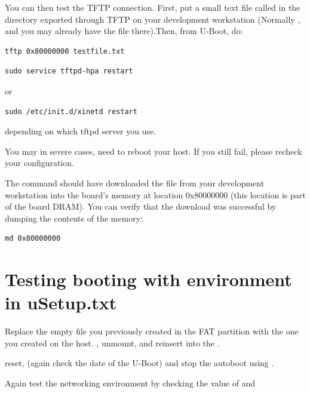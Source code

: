 You can then test the TFTP connection. First, put a small text file called
 in the directory exported through TFTP on your development
workstation (Normally , and you may already have the file there).Then, from U-Boot, do:

\begin{verbatim}
tftp 0x80000000 testfile.txt
\end{verbatim}



\begin{verbatim}
sudo service tftpd-hpa restart
\end{verbatim}

or

\begin{verbatim}
sudo /etc/init.d/xinetd restart
\end{verbatim}

depending on which tftpd server you use.

You may in severe cases, need to reboot your host.
If you still fail, please recheck your configuration.

The  command should have downloaded
the  file from your development
workstation into the board's memory at location 0x80000000 (this
location is part of the board DRAM). You can verify that the download
was successful by dumping the contents of the memory:

\begin{verbatim}
md 0x80000000
\end{verbatim}

\clearpage
\section{Testing booting with environment in uSetup.txt}

Replace the empty  file you previously created in the FAT partition
with the one you created on the host.  , unmount, and reinsert into the
\devboard.

reset, (again check the date of the U-Boot) and stop the autoboot using .

Again test the networking environment by checking the value of  and 

